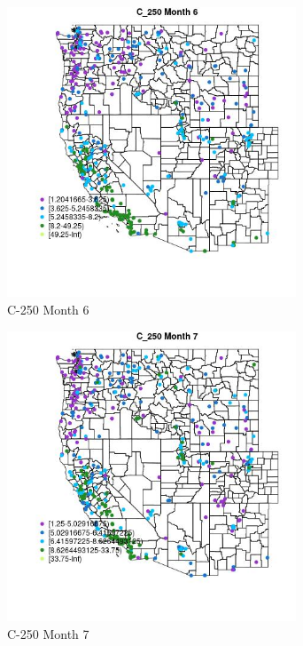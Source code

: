 \begin{figure} 
\centering  
\includegraphics[width=0.77\textwidth]{Code_Outputs/ML_input_report_ML_input_PM25_Step5_part_d_de_duplicated_aves_ML_input_MapObsMo6C_250.jpg} 
\caption{\label{fig:ML_input_report_ML_input_PM25_Step5_part_d_de_duplicated_aves_ML_inputMapObsMo6C_250}C-250 Month 6} 
\end{figure} 
 

\begin{figure} 
\centering  
\includegraphics[width=0.77\textwidth]{Code_Outputs/ML_input_report_ML_input_PM25_Step5_part_d_de_duplicated_aves_ML_input_MapObsMo7C_250.jpg} 
\caption{\label{fig:ML_input_report_ML_input_PM25_Step5_part_d_de_duplicated_aves_ML_inputMapObsMo7C_250}C-250 Month 7} 
\end{figure} 
 

